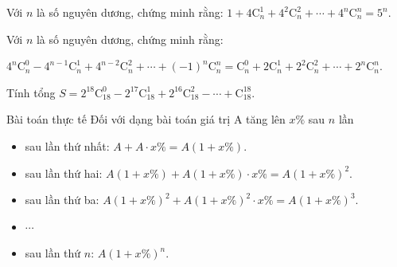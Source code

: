 \begin{vd}%
	Với $n$ là số nguyên dương, chứng minh rằng: $1+4\mathrm{C}_n^1+4^2\mathrm{C}_n^2+\cdots+4^n\mathrm{C}_n^n=5^n$.
\end{vd}
\begin{vd}%
	Với $n$ là số nguyên dương, chứng minh rằng:
	\begin{center}
		$4^n\mathrm{C}_n^0-4^{n-1}\mathrm{C}_n^1+4^{n-2}\mathrm{C}_n^2+\cdots+(-1)^n\mathrm{C}_n^n=\mathrm{C}_n^0+2\mathrm{C}_n^1+2^2\mathrm{C}_n^2+\cdots+2^n\mathrm{C}_n^n$.
	\end{center}
\end{vd}
\begin{vd}%
	Tính tổng $S=2^{18}\mathrm{C}_{18}^0-2^{17}\mathrm{C}_{18}^1+2^{16}\mathrm{C}_{18}^2-\cdots+\mathrm{C}_{18}^{18}$.
\end{vd}
\begin{dang}{Bài toán thực tế}
	Đối với dạng bài toán giá trị A tăng lên $x\%$ sau $n$ lần
	\begin{itemize}
		\item sau lần thứ nhất: $A + A \cdot x\% = A(1 + x\%)$.
		\item sau lần thứ hai: $A(1 + x\%) + A(1 + x\%) \cdot x\% = A(1 + x\%)^2$.
		\item sau lần thứ ba: $A(1 + x\%)^2 + A(1 + x\%)^2\cdot x\% = A(1 + x\%)^3$.
		\item $\cdots$
		\item sau lần thứ $n$: $A(1 + x\%)^n$.
	\end{itemize}
\end{dang}
